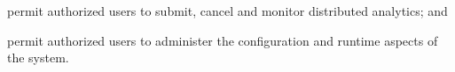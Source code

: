 \begin{description}
  \item permit authorized users to submit, cancel and monitor distributed
  analytics; and
  \item permit authorized users to administer the configuration and runtime
  aspects of the system.
\end{description}        